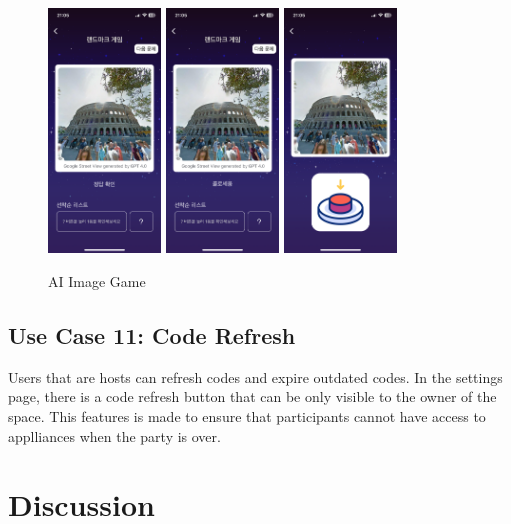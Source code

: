 \documentclass[conference]{IEEEtran}
\begin{document}
        \begin{figure}[htbp]
            \centerline{\includegraphics[width=3cm]{Images/screen/game/geo/GEO3_HOST.PNG}
            \includegraphics[width=3cm]{Images/screen/game/geo/GEO3_ANSWER.PNG}
             \includegraphics[width=3cm]{Images/screen/game/geo/GEO3_PLAYER.PNG}}
            \caption{AI Image Game}
            \label{fig}
        \end{figure}
    \subsection{Use Case 11: Code Refresh}
        Users that are hosts can refresh codes and expire outdated codes. In the settings page, there is a code refresh button that can be only visible to the owner of the space. This features is made to ensure that participants cannot have access to applliances when the party is over.\\


\section{Discussion}
    

\tableofcontents
\listoftables
\listoffigures
\end{document}
